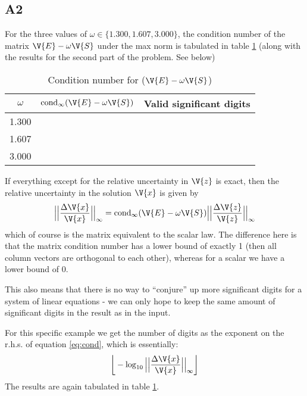 \documentclass[a4paper,10pt]{article}
\begin{document}
	\subsection*{A2}
	For the three values of $ \omega \in \{1.300, 1.607, 3.000\} $, the condition number of the matrix $ \V{E}-\omega \V{S} $ under the max norm is tabulated in table \ref{tab:condition} (along with the results for the second part of the problem. See below)
	\begin{table}[H]
		\centering
		\begin{tabular}{c|c|c}
			$ \omega $ & $\text{cond}_{\infty}(\V{E}-\omega \V{S})$ & Valid significant digits\\
			\hline
			1.300 & &\\
			1.607 & &\\
			3.000 & &
		\end{tabular}
		\caption{Condition number for ($ \V{E}-\omega \V{S} $)}
		\label{tab:condition}
	\end{table}
	If everything except for the relative uncertainty in $ \V{z} $ is exact, then the relative uncertainty in the solution $ \V{x} $ is given by
	\begin{equation}\label{eq:cond}
		\Big|\Big|\frac{\Delta \V{x}}{\V{x}}\Big|\Big|_{\infty} = \text{cond}_{\infty} (\V{E}-\omega\V{S}) \Big|\Big|\frac{\Delta \V{z}}{\V{z}}\Big|\Big|_{\infty}
	\end{equation}
	which of course is the matrix equivalent to the scalar law. The difference here is that the matrix condition number has a lower bound of exactly 1 (then all column vectors are orthogonal to each other), whereas for a scalar we have a lower bound of 0.
	
	This also means that there is no way to ``conjure'' up more significant digits for a system of linear equations - we can only hope to keep the same amount of significant digits in the result as in the input.
	
	For this specific example we get the number of digits as the exponent on the r.h.s. of equation \ref{eq:cond}, which is essentially:
	\begin{equation}\label{eq:sigfig}
		\bigg\lfloor -\log_{10} \Big|\Big|\frac{\Delta \V{x}}{\V{x}}\Big|\Big|_{\infty}\bigg\rfloor
	\end{equation}
	The results are again tabulated in table \ref{tab:condition}.
	
\end{document}
